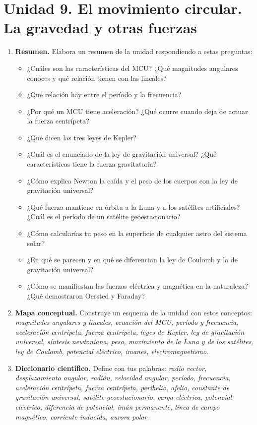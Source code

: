 \section{Unidad 9. El movimiento circular. La gravedad y otras fuerzas}

\begin{enumerate}[label=\numberballred]
    \item \textbf{Resumen.} Elabora un resumen de la unidad respondiendo a estas preguntas:
    \begin{itemize}
        \item ¿Cuáles son las características del MCU? ¿Qué magnitudes angulares conoces y qué relación tienen con las lineales?
        \item ¿Qué relación hay entre el período y la frecuencia?
        \item ¿Por qué un MCU tiene aceleración? ¿Qué ocurre cuando deja de actuar la fuerza centrípeta?
        \item ¿Qué dicen las tres leyes de Kepler?
        \item ¿Cuál es el enunciado de la ley de gravitación universal? ¿Qué características tiene la fuerza gravitatoria?
        \item ¿Cómo explica Newton la caída y el peso de los cuerpos con la ley de gravitación universal?
        \item ¿Qué fuerza mantiene en órbita a la Luna y a los satélites artificiales? ¿Cuál es el período de un satélite geoestacionario?
        \item ¿Cómo calcularías tu peso en la superficie de cualquier astro del sistema solar?
        \item ¿En qué se parecen y en qué se diferencian la ley de Coulomb y la de gravitación universal?
        \item ¿Cómo se manifiestan las fuerzas eléctrica y magnética en la naturaleza? ¿Qué demostraron Oersted y Faraday?
    \end{itemize}
    \item \textbf{Mapa conceptual.} Construye un esquema de la unidad con estos conceptos: \emph{magnitudes angulares y lineales, ecuación del MCU, período y frecuencia, aceleración centrípeta, fuerza centrípeta, leyes de Kepler, ley de gravitación universal, síntesis newtoniana, peso, movimiento de la Luna y de los satélites, ley de Coulomb, potencial eléctrico, imanes, electromagnetismo}.
    \item \textbf{Diccionario científico.} Define con tus palabras: \emph{radio vector, desplazamiento angular, radián, velocidad angular, período, frecuencia, aceleración centrípeta, fuerza centrípeta, perihelio, afelio, constante de gravitación universal, satélite geoestacionario, carga eléctrica, potencial eléctrico, diferencia de potencial, imán permanente, línea de campo magnético, corriente inducida, aurora polar}.
\end{enumerate}

